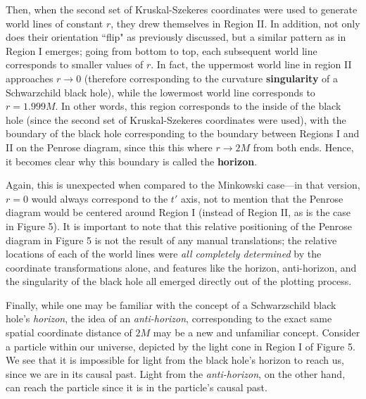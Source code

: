\documentclass{article}
\begin{document}
Then, when the second set of Kruskal-Szekeres coordinates were used to generate world lines of constant $r$, they drew themselves in Region II. In addition, not only does their orientation ``flip" as previously discussed, but a similar pattern as in Region I emerges; going from bottom to top, each subsequent world line corresponds to smaller values of $r$. In fact, the uppermost world line in region II approaches $r\rightarrow0$ (therefore corresponding to the curvature \textbf{singularity} of a Schwarzchild black hole), while the lowermost world line corresponds to $r=1.999M$. In other words, this region corresponds to the inside of the black hole (since the second set of Kruskal-Szekeres coordinates were used), with the boundary of the black hole corresponding to the boundary between Regions I and II on the Penrose diagram, since this this where $r\rightarrow2M$ from both ends. Hence, it becomes clear why this boundary is called the \textbf{horizon}.

Again, this is unexpected when compared to the Minkowski case---in that version, $r=0$ would always correspond to the $t'$ axis, not to mention that the Penrose diagram would be centered around Region I (instead of Region II, as is the case in Figure 5). It is important to note that this relative positioning of the Penrose diagram in Figure 5 is not the result of any manual translations; the relative locations of each of the world lines were \textit{all completely determined} by the coordinate transformations alone, and features like the horizon, anti-horizon, and the singularity of the black hole all emerged directly out of the plotting process.

Finally, while one may be familiar with the concept of a Schwarzschild black hole's \textit{horizon}, the idea of an \textit{anti-horizon}, corresponding to the exact same spatial coordinate distance of $2M$ may be a new and unfamiliar concept. Consider a particle within our universe, depicted by the light cone in Region I of Figure 5. We see that it is impossible for light from the black hole's horizon to reach us, since we are in its causal past. Light from the \textit{anti-horizon}, on the other hand, can reach the particle since it is in the particle's causal past.
\end{document}
